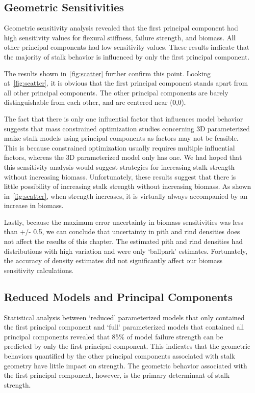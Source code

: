 \subsection{Geometric Sensitivities}
\label{ssec:geometric_sensitivities}
Geometric sensitivity analysis revealed that the first principal component had high sensitivity values for flexural stiffness, failure strength, and biomass. All other principal components had low sensitivity values. These results indicate that the majority of stalk behavior is influenced by only the first principal component. 

The results shown in~\cref{fig:scatter} further confirm this point. Looking at~\cref{fig:scatter}, it is obvious that the first principal component stands apart from all other principal components. The other principal components are barely distinguishable from each other, and are centered near (0,0). 

The fact that there is only one influential factor that influences model behavior suggests that mass constrained optimization studies concerning 3D parameterized maize stalk models using principal components as factors may not be feasible. This is because constrained optimization usually requires multiple influential factors, whereas the 3D parameterized model only has one. We had hoped that this sensitivity analysis would suggest strategies for increasing stalk strength without increasing biomass. Unfortunately, these results suggest that there is little possibility of increasing stalk strength without increasing biomass. As shown in~\cref{fig:scatter}, when strength increases, it is virtually always accompanied by an increase in biomass.

Lastly, because the maximum error uncertainty in biomass sensitivities was less than +/- 0.5, we can conclude that uncertainty in pith and rind densities does not affect the results of this chapter. The estimated pith and rind densities had distributions with high variation and were only ‘ballpark’ estimates. Fortunately, the accuracy of density estimates did not significantly affect our biomass sensitivity calculations.

\subsection{Reduced Models and Principal Components}
\label{ssec:reduced_models_and_principal_components}
Statistical analysis between ‘reduced’ parameterized models that only contained the first principal component and ‘full’ parameterized models that contained all principal components revealed that 85\% of model failure strength can be predicted by only the first principal component. This indicates that the geometric behaviors quantified by the other principal components associated with stalk geometry have little impact on strength. The geometric behavior associated with the first principal component, however, is the primary determinant of stalk strength.

